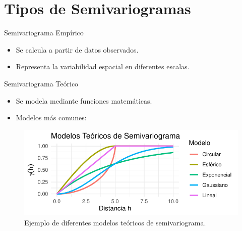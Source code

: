 \documentclass[
  10pt,
  ignorenonframetext,
]{beamer}
\providecommand{\tightlist}{%
  \setlength{\itemsep}{0pt}\setlength{\parskip}{0pt}}
\begin{document}
\section{Tipos de Semivariogramas}\label{tipos-de-semivariogramas}

\begin{frame}{Semivariograma Empírico}
\label{semivariograma-empuxedrico}
\begin{itemize}
\tightlist
\item
  Se calcula a partir de datos observados.
\item
  Representa la variabilidad espacial en diferentes escalas.
\end{itemize}
\end{frame}

\begin{frame}{Semivariograma Teórico}
\label{semivariograma-teuxf3rico}
\begin{itemize}
\tightlist
\item
  Se modela mediante funciones matemáticas.
\item
  Modelos más comunes:
\end{itemize}

\begin{figure}
\centering
\includegraphics{imagenes/unnamed-chunk-3-1.pdf}
\caption{Ejemplo de diferentes modelos teóricos de semivariograma.}
\end{figure}
\end{frame}
\end{document}

